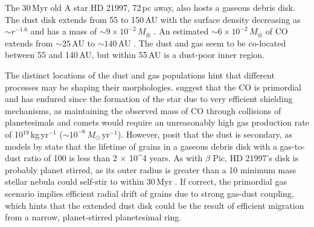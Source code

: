 



The 30\,Myr old A star HD 21997, 72\,pc away, also hosts a gaseous debris disk. The dust disk extends from 55 to 150\,AU with the surface density decreasing as $\sim r^{-1.6}$ and has a mass of $\sim 9\times10^{-2}$\,$M_{\oplus}$ \citep{Moor13}. An estimated $\sim 6\times10^{-2}$\,$M_{\oplus}$ of CO extends from $\sim 25$\,AU to  $\sim 140$\,AU \citep{Kosp13}. The dust and gas seem to be co-located between 55 and 140\,AU, but within 55\,AU is a dust-poor inner region. 

The distinct locations of the dust and gas populations hint that different processes may be shaping their morphologies. \cite{Kosp13} suggest that the CO is primordial and has endured since the formation of the star due to very efficient shielding mechanisms, as maintaining the observed mass of CO through collisions of planetesimals and comets would require an unreasonably high gas production rate of 10$^{19}$\,kg\,yr$^{-1}$ ($\sim 10^{-6}\,M_{\odot}$\,yr$^{-1}$). However, \cite{Moor13} posit that the dust is secondary, as models by \cite{Kriv09} state that the lifetime of grains in a gaseous debris disk with a gas-to-dust ratio of 100 is less than 2 $\times$ 10^{4} years. As with $\beta$ Pic, HD 21997's disk is probably planet stirred, as its outer radius is greater than a 10 minimum mass stellar nebula could self-stir to within 30\,Myr \citep{Moor15}. If correct, the primordial gas scenario implies efficient radial drift of grains due to strong gas-dust coupling, which hints that the extended dust disk could be the result of efficient migration from a narrow, planet-stirred planetesimal ring. 

